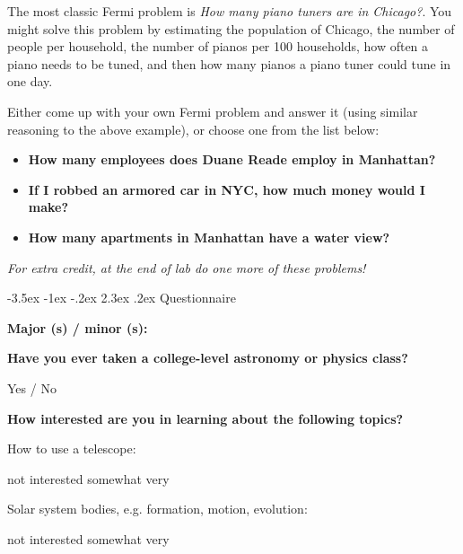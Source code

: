 \documentclass[12pt]{article}
\makeatletter
\renewcommand\section{\@startsection{section}{1}{\z@}%
                                  {-3.5ex \@plus -1ex \@minus -.2ex}%
                                  {2.3ex \@plus.2ex}%
                                  {\normalfont\large\bfseries}}
\makeatother
\begin{document}
The most classic Fermi problem is \emph{How many piano tuners are in Chicago?}. You might solve this problem by estimating the population of Chicago, the number of people per household, the number of pianos per 100 households, how often a piano needs to be tuned, and then how many pianos a piano tuner could tune in one day. 

Either come up with your own Fermi problem and answer it (using similar reasoning to the above example), or choose one from the list below:

\begin{itemize}
	\item \textbf{How many employees does Duane Reade employ in Manhattan?}
	\item \textbf{If I robbed an armored car in NYC, how much money would I make?}
	\item \textbf{How many apartments in Manhattan have a water view?}
\end{itemize}

\emph{For extra credit, at the end of lab do one more of these problems!}

\clearpage

\section{Questionnaire}

\noindent\textbf{Major (s) / minor (s):}

\vspace{0.2in}

\noindent\textbf{Have you ever taken a college-level astronomy or physics class?}

\vspace{0.1in}
Yes / No

\vspace{0.2in}
\noindent\textbf{How interested are you in learning about the following topics?}

\vspace{0.1in}

How to use a telescope:
\begin{center}
	not interested \hspace{0.3in} somewhat \hspace{0.3in} very
\end{center}

\vspace{0.1in}

Solar system bodies, e.g. formation, motion, evolution:
\begin{center}
	not interested \hspace{0.3in} somewhat \hspace{0.3in} very
\end{center}
\end{document}
